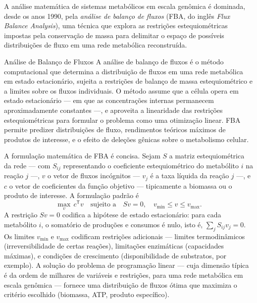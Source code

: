 A análise matemática de sistemas metabólicos em escala genômica é dominada, desde os anos 1990, pela \emph{análise de balanço de fluxos} (FBA, do inglês \emph{Flux Balance Analysis}), uma técnica que explora as restrições estequiométricas impostas pela conservação de massa para delimitar o espaço de possíveis distribuições de fluxo em uma rede metabólica reconstruída.

\begin{definicao}{Análise de Balanço de Fluxos}
A análise de balanço de fluxos é o método computacional que determina a distribuição de fluxos em uma rede metabólica em estado estacionário, sujeita a restrições de balanço de massa estequiométrico e a limites sobre os fluxos individuais. O método assume que a célula opera em estado estacionário --- em que as concentrações internas permanecem aproximadamente constantes ---, e aproveita a linearidade das restrições estequiométricas para formular o problema como uma otimização linear. FBA permite predizer distribuições de fluxo, rendimentos teóricos máximos de produtos de interesse, e o efeito de deleções gênicas sobre o metabolismo celular.
\end{definicao}

A formulação matemática de FBA é concisa. Sejam $S$ a matriz estequiométrica da rede --- com $S_{ij}$ representando o coeficiente estequiométrico do metabólito $i$ na reação $j$ ---, $v$ o vetor de fluxos incógnitos --- $v_j$ é a taxa líquida da reação $j$ ---, e $c$ o vetor de coeficientes da função objetivo --- tipicamente a biomassa ou o produto de interesse. A formulação padrão é
\begin{equation*}
\max_{v} \, c^{\mathsf{T}} v \quad \text{sujeito a} \quad S v = 0, \quad v_{\min} \leq v \leq v_{\max}.
\end{equation*}
A restrição $Sv = 0$ codifica a hipótese de estado estacionário: para cada metabólito $i$, o somatório de produções e consumos é nulo, isto é, $\sum_j S_{ij} v_j = 0$. Os limites $v_{\min}$ e $v_{\max}$ codificam restrições adicionais --- limites termodinâmicos (irreversibilidade de certas reações), limitações enzimáticas (capacidades máximas), e condições de crescimento (disponibilidade de substratos, por exemplo). A solução do problema de programação linear --- cuja dimensão típica é da ordem de milhares de variáveis e restrições, para uma rede metabólica em escala genômica --- fornece uma distribuição de fluxos ótima que maximiza o critério escolhido (biomassa, ATP, produto específico).

